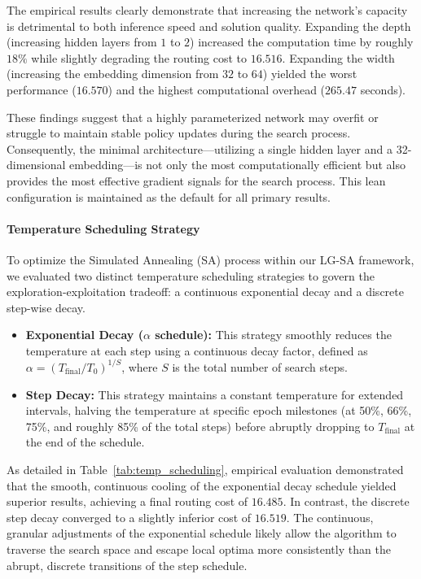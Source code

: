 \documentclass[letterpaper]{article} %
\begin{document}
The empirical results clearly demonstrate that increasing the network's capacity is detrimental to both inference speed and solution quality. Expanding the depth (increasing hidden layers from $1$ to $2$) increased the computation time by roughly $18\%$ while slightly degrading the routing cost to $16.516$. Expanding the width (increasing the embedding dimension from $32$ to $64$) yielded the worst performance ($16.570$) and the highest computational overhead ($265.47$ seconds). 

These findings suggest that a highly parameterized network may overfit or struggle to maintain stable policy updates during the search process. Consequently, the minimal architecture---utilizing a single hidden layer and a 32-dimensional embedding---is not only the most computationally efficient but also provides the most effective gradient signals for the search process. This lean configuration is maintained as the default for all primary results.

\paragraph{Temperature Scheduling Strategy}

To optimize the Simulated Annealing (SA) process within our LG-SA framework, we evaluated two distinct temperature scheduling strategies to govern the exploration-exploitation tradeoff: a continuous exponential decay and a discrete step-wise decay. 

\begin{itemize}
    \item \textbf{Exponential Decay ($\alpha$ schedule):} This strategy smoothly reduces the temperature at each step using a continuous decay factor, defined as $\alpha = (T_\mathrm{final} / T_0)^{1/S}$, where $S$ is the total number of search steps.
    \item \textbf{Step Decay:} This strategy maintains a constant temperature for extended intervals, halving the temperature at specific epoch milestones (at 50\%, 66\%, 75\%, and roughly 85\% of the total steps) before abruptly dropping to $T_\mathrm{final}$ at the end of the schedule.
\end{itemize}

As detailed in Table~\ref{tab:temp_scheduling}, empirical evaluation demonstrated that the smooth, continuous cooling of the exponential decay schedule yielded superior results, achieving a final routing cost of $16.485$. In contrast, the discrete step decay converged to a slightly inferior cost of $16.519$. The continuous, granular adjustments of the exponential schedule likely allow the algorithm to traverse the search space and escape local optima more consistently than the abrupt, discrete transitions of the step schedule.
\end{document}

